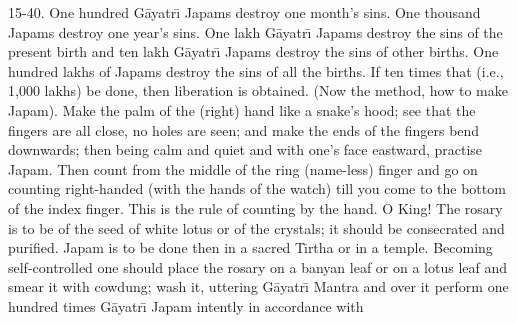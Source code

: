 15-40. One hundred G\=ayatr\={\i} Japams destroy one month's sins. One thousand Japams destroy one year's sins. One lakh G\=ayatr\={\i} Japams destroy the sins of the present birth and ten lakh G\=ayatr\={\i} Japams destroy the sins of other births. One hundred lakhs of Japams destroy the sins of all the births. If ten times that (i.e., 1,000 lakhs) be done, then liberation is obtained. (Now the method, how to make Japam). Make the palm of the (right) hand like a snake's hood; see that the fingers are all close, no holes are seen; and make the ends of the fingers bend downwards; then being calm and quiet and with one's face eastward, practise Japam. Then count from the middle of the ring (name-less) finger and go on counting right-handed (with the hands of the watch) till you come to the bottom of the index finger. This is the rule of counting by the hand. O King! The rosary is to be of the seed of white lotus or of the crystals; it should be consecrated and purified. Japam is to be done then in a sacred T\={\i}rtha or in a temple. Becoming self-controlled one should place the rosary on a banyan leaf or on a lotus leaf and smear it with cowdung; wash it, uttering G\=ayatr\={\i} Mantra and over it perform one hundred times G\=ayatr\={\i} Japam intently in accordance with

